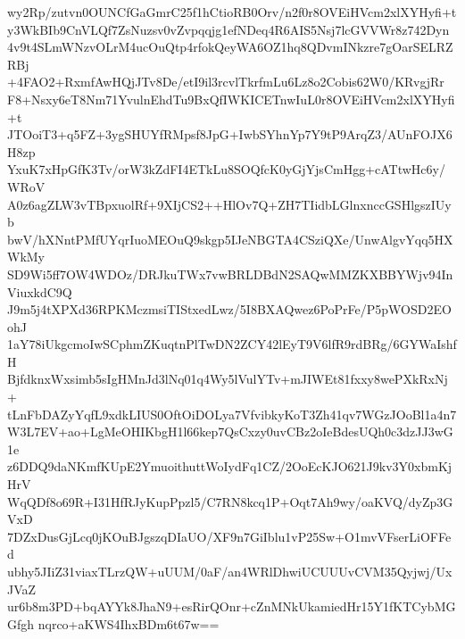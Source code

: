 wy2Rp/zutvn0OUNCfGaGmrC25f1hCtioRB0Orv/n2f0r8OVEiHVcm2xlXYHyfi+t
y3WkBIb9CnVLQf7ZsNuzsv0vZvpqqjg1efNDeq4R6AIS5Nsj7lcGVVWr8z742Dyn
4v9t4SLmWNzvOLrM4ucOuQtp4rfokQeyWA6OZ1hq8QDvmINkzre7gOarSELRZRBj
+4FAO2+RxmfAwHQjJTv8De/etI9il3rcvlTkrfmLu6Lz8o2Cobis62W0/KRvgjRr
F8+Nsxy6eT8Nm71YvulnEhdTu9BxQfIWKICETnwIuL0r8OVEiHVcm2xlXYHyfi+t
JTOoiT3+q5FZ+3ygSHUYfRMpsf8JpG+IwbSYhnYp7Y9tP9ArqZ3/AUnFOJX6H8zp
YxuK7xHpGfK3Tv/orW3kZdFI4ETkLu8SOQfcK0yGjYjsCmHgg+cATtwHc6y/WRoV
A0z6agZLW3vTBpxuolRf+9XIjCS2++HlOv7Q+ZH7TIidbLGlnxnccGSHlgszIUyb
bwV/hXNntPMfUYqrIuoMEOuQ9skgp5IJeNBGTA4CSziQXe/UnwAlgvYqq5HXWkMy
SD9Wi5ff7OW4WDOz/DRJkuTWx7vwBRLDBdN2SAQwMMZKXBBYWjv94InViuxkdC9Q
J9m5j4tXPXd36RPKMczmsiTIStxedLwz/5I8BXAQwez6PoPrFe/P5pWOSD2EOohJ
1aY78iUkgcmoIwSCphmZKuqtnPlTwDN2ZCY42lEyT9V6lfR9rdBRg/6GYWaIshfH
BjfdknxWxsimb5sIgHMnJd3lNq01q4Wy5lVulYTv+mJIWEt81fxxy8wePXkRxNj+
tLnFbDAZyYqfL9xdkLIUS0OftOiDOLya7VfvibkyKoT3Zh41qv7WGzJOoBl1a4n7
W3L7EV+ao+LgMeOHIKbgH1l66kep7QsCxzy0uvCBz2oIeBdesUQh0c3dzJJ3wG1e
z6DDQ9daNKmfKUpE2YmuoithuttWoIydFq1CZ/2OoEcKJO621J9kv3Y0xbmKjHrV
WqQDf8o69R+I31HfRJyKupPpzl5/C7RN8kcq1P+Oqt7Ah9wy/oaKVQ/dyZp3GVxD
7DZxDusGjLcq0jKOuBJgszqDIaUO/XF9n7GiIblu1vP25Sw+O1mvVFserLiOFFed
ubhy5JIiZ31viaxTLrzQW+uUUM/0aF/an4WRlDhwiUCUUUvCVM35Qyjwj/UxJVaZ
ur6b8m3PD+bqAYYk8JhaN9+esRirQOnr+cZnMNkUkamiedHr15Y1fKTCybMGGfgh
nqrco+aKWS4IhxBDm6t67w==
